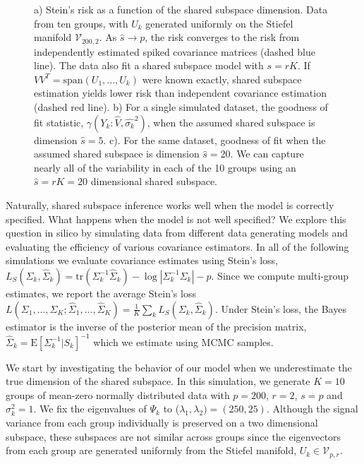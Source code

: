 \documentclass{statsoc}
\newcommand{\Exp}[1]{{\text{E}}[ \ensuremath{ #1 } ]  }
\begin{document}
\begin{figure}[t]
    \centering
      \caption{a) Stein's risk as a function of the
      shared subspace dimension.  Data from ten groups, with $U_k$
      generated uniformly on the Stiefel manifold
      $\mathcal{V}_{200, 2}$.  As $\hat{s} \rightarrow p$, the risk converges to the
      risk from independently estimated spiked covariance matrices
      (dashed blue line).  The data also fit a shared subspace model
      with $s=rK$.  If $VV^T = \text{span}(U_1, ..., U_k)$ were known
      exactly, shared subspace estimation yields lower risk than
      independent covariance estimation (dashed red line).  b) For a
      single simulated dataset, the goodness of fit statistic,
      $\gamma(Y_k: \hat{V}, \hat{\sigma_k}^2)$, when the assumed
      shared subspace is dimension $\hat{s} = 5$.  c).  For the same
      dataset, goodness of fit when the assumed shared subspace is
      dimension $\hat{s} = 20$.  We can capture nearly all of the
      variability in each of the 10 groups using an $\hat{s}=rK=20$
      dimensional shared subspace. }
\label{fig:dimensionPlots}
\end{figure}

Naturally, shared subspace inference works well when the model is
correctly specified.  What happens when the model is not well
specified?  We explore this question in silico by simulating data from
different data generating models and evaluating the efficiency of
various covariance estimators.  In all of the following simulations we
evaluate covariance estimates using Stein's loss,
$L_S( \Sigma_k , \hat\Sigma_k) = \text{tr}( \Sigma_k^{-1} \hat
\Sigma_k ) - \log |\Sigma_k^{-1} \Sigma_k | - p$.
Since we compute multi-group estimates, we report the
average Stein's loss
$L(\Sigma_1, ..., \Sigma_K; \hat\Sigma_1, ..., \hat\Sigma_K ) =
\frac{1}{K} \sum_k L_S( \Sigma_k , \hat\Sigma_k)$.
Under Stein's loss, the Bayes estimator is the inverse of
the posterior mean of the precision matrix,
$\hat \Sigma_{k} = \Exp{ \Sigma_k^{-1} | S_k}^{-1}$ which we
estimate using MCMC samples.

We start by investigating the behavior of our model when we
underestimate the true dimension of the shared subspace.  In this
simulation, we generate $K=10$ groups of mean-zero normally
distributed data with $p=200$, $r=2$, $s=p$ and $\sigma_k^2=1$.  We
fix the eigenvalues of $\Psi_k$ to
($\lambda_1, \lambda_2) = (250, 25)$.  Although the signal variance
from each group individually is preserved on a two dimensional
subspace, these subspaces are not similar across groups since the
eigenvectors from each group are generated uniformly from the Stiefel
manifold, $U_k \in \mathcal{V}_{p, r}$.
\end{document}
